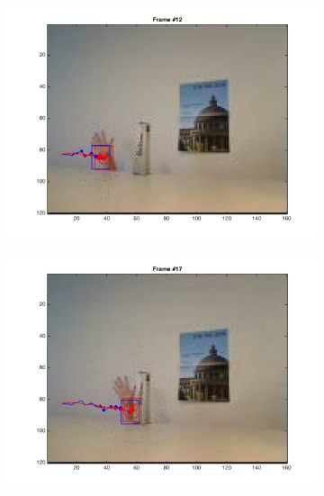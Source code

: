 \documentclass{ethz_report}
\begin{document}
\begin{figure}[H]
    \begin{subfigure}[b]{.25\textwidth}
        \centering
        \includegraphics[width=1\linewidth]{images/video2__11}
    \end{subfigure}%
    \begin{subfigure}[b]{.25\textwidth}
        \centering
        \includegraphics[width=1\linewidth]{images/video2__16}
    \end{subfigure}
    \begin{subfigure}[b]{.25\textwidth}
        \centering

\end{subfigure}
\end{figure}
\end{document}
